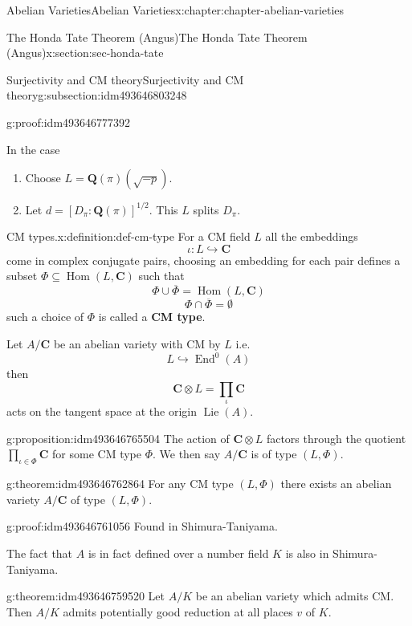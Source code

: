\documentclass[oneside,10pt,]{book}
\newcommand{\terminology}[1]{\textbf{#1}}
\numberwithin{equation}{section}
\DeclareMathOperator{\Lie}{Lie}
\newcommand{\lb}{[}
\newcommand{\rb}{]}
\newcommand{\QQ}{\mathbf{Q}}
\newcommand{\CC}{\mathbf{C}}
\DeclareMathOperator{\End}{End}
\DeclareMathOperator{\Hom}{Hom}
\begin{document}
\begin{chapterptx}{Abelian Varieties}{}{Abelian Varieties}{}{}{x:chapter:chapter-abelian-varieties}
\begin{sectionptx}{The Honda Tate Theorem (Angus)}{}{The Honda Tate Theorem (Angus)}{}{}{x:section:sec-honda-tate}
\begin{subsectionptx}{Surjectivity and CM theory}{}{Surjectivity and CM theory}{}{}{g:subsection:idm493646803248}
\begin{proofptx}{}{g:proof:idm493646777392}
\begin{enumerate}
\end{enumerate}
In the case%
\begin{enumerate}
\item{}Choose \(L = \QQ(\pi)(\sqrt{-p})\).%
\item{}Let \(d= \lb D_\pi: \QQ(\pi)\rb^{1/2}\). This \(L\) splits \(D_\pi\).%
\end{enumerate}
%
\end{proofptx}
\begin{definition}{CM types.}{x:definition:def-cm-type}%
For a CM field \(L\) all the embeddings%
\begin{equation*}
\iota\colon L \hookrightarrow \CC
\end{equation*}
come in complex conjugate pairs, choosing an embedding for each pair defines a subset \(\Phi\subseteq \Hom(L, \CC)\) such that%
\begin{equation*}
\Phi \cup \overline \Phi = \Hom(L,\CC)
\end{equation*}
%
\begin{equation*}
\Phi \cap \overline \Phi = \emptyset
\end{equation*}
such a choice of \(\Phi \) is called a \terminology{CM type}.%
\end{definition}
Let \(A/\CC\) be an abelian variety with CM by \(L\) i.e.%
\begin{equation*}
L\hookrightarrow \End^0(A)
\end{equation*}
then%
\begin{equation*}
\CC\otimes L = \prod_\iota \CC
\end{equation*}
acts on the tangent space at the origin \(\Lie(A)\).%
\begin{proposition}{}{}{g:proposition:idm493646765504}%
The action of \(\CC\otimes L\) factors through the quotient \(\prod_{\iota\in \Phi} \CC\) for some CM type \(\Phi\). We then say \(A/\CC\) is of type \((L,\Phi)\).%
\end{proposition}
\begin{theorem}{}{}{g:theorem:idm493646762864}%
For any CM type \((L,\Phi)\) there exists an abelian variety \(A/\CC\) of type \((L, \Phi)\).%
\end{theorem}
\begin{proofptx}{}{g:proof:idm493646761056}
Found in Shimura-Taniyama.%
\end{proofptx}
The fact that \(A\) is in fact defined over  a number field \(K\) is also in Shimura-Taniyama.%
\begin{theorem}{}{}{g:theorem:idm493646759520}%
Let \(A/K\) be an abelian variety which admits CM. Then \(A/K\) admits potentially good reduction at all places \(v\) of \(K\).%

\end{theorem}
\end{subsectionptx}
\end{sectionptx}
\end{chapterptx}
\end{document}
